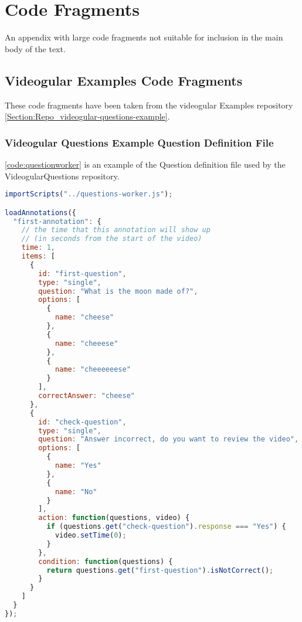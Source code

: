 \chapter{Code Fragments} \label{Chapter:Code Fragments}

\begin{preamble}
	An appendix with large code fragments not suitable for inclusion in the main body of the text.
\end{preamble}

\section{Videogular Examples Code Fragments}

These code fragments have been taken from the videogular Examples repository \autoref{Section:Repo_videogular-questions-example}.

\subsection{Videogular Questions Example Question Definition File}

\autoref{code:questionworker} is an example of the Question definition file used by the VideogularQuestions repository.

\begin{lstlisting}[language=javascript,caption={Code for loading an annotation},label={code:questionworker} ]
importScripts("../questions-worker.js");

loadAnnotations({
  "first-annotation": {
    // the time that this annotation will show up
    // (in seconds from the start of the video)
    time: 1,
    items: [
      {
        id: "first-question",
        type: "single",
        question: "What is the moon made of?",
        options: [
          {
            name: "cheese"
          },
          {
            name: "cheeese"
          },
          {
            name: "cheeeeeese"
          }
        ],
        correctAnswer: "cheese"
      },
      {
        id: "check-question",
        type: "single",
        question: "Answer incorrect, do you want to review the video",
        options: [
          {
            name: "Yes"
          },
          {
            name: "No"
          }
        ],
        action: function(questions, video) {
          if (questions.get("check-question").response === "Yes") {
            video.setTime(0);
          }
        },
        condition: function(questions) {
          return questions.get("first-question").isNotCorrect();
        }
      }
    ]
  }
});
\end{lstlisting}

